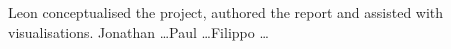\documentclass{article}
\theoremstyle{plain}
\theoremstyle{definition}
\theoremstyle{remark}
\begin{document}
Leon conceptualised the project, authored the report and assisted with visualisations. Jonathan \ldots Paul \ldots Filippo \ldots
\\






\end{document}
